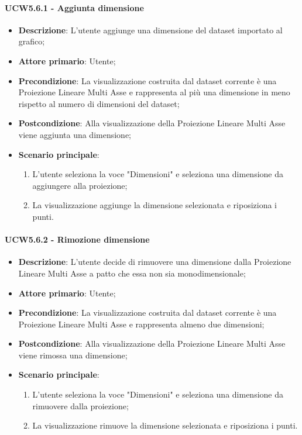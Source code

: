 \paragraph{UCW5.6.1 - Aggiunta dimensione}
\label{par:ucw5.6.1}
\begin{itemize}
    \item \textbf{Descrizione}: L’utente aggiunge una dimensione del dataset importato al grafico;

    \item \textbf{Attore primario}: Utente;

    \item \textbf{Precondizione}:   La visualizzazione costruita dal dataset corrente è una Proiezione Lineare Multi Asse
                                    e rappresenta al più una dimensione in meno rispetto al numero di dimensioni del dataset;
    \item \textbf{Postcondizione}:  Alla visualizzazione della Proiezione Lineare Multi Asse viene aggiunta una dimensione;

	\item \textbf{Scenario principale}:
        \begin{enumerate}
            \item L'utente seleziona la voce "Dimensioni" e seleziona una dimensione da aggiungere alla proiezione;
            \item La visualizzazione aggiunge la dimensione selezionata e riposiziona i punti.
        \end{enumerate}
\end{itemize}

\paragraph{UCW5.6.2 - Rimozione dimensione}
\label{par:ucw5.6.2}
\begin{itemize}
    \item \textbf{Descrizione}: L’utente decide di rimuovere una dimensione dalla Proiezione Lineare Multi Asse
                                a patto che essa non sia monodimensionale;

    \item \textbf{Attore primario}: Utente;

    \item \textbf{Precondizione}:   La visualizzazione costruita dal dataset corrente è una Proiezione Lineare Multi Asse
                                    e rappresenta almeno due dimensioni;
    \item \textbf{Postcondizione}:  Alla visualizzazione della Proiezione Lineare Multi Asse viene rimossa una dimensione;

	\item \textbf{Scenario principale}:
        \begin{enumerate}
            \item L'utente seleziona la voce "Dimensioni" e seleziona una dimensione da rimuovere dalla proiezione;
            \item La visualizzazione rimuove la dimensione selezionata e riposiziona i punti.
        \end{enumerate}
\end{itemize}

